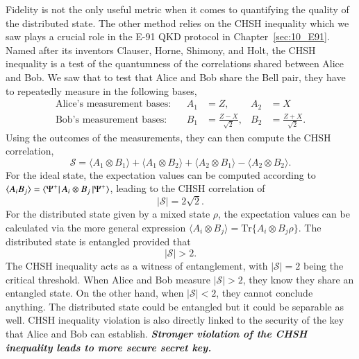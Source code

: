 Fidelity is not the only useful metric when it comes to quantifying the quality of the distributed state.
The other method relies on the CHSH inequality which we saw plays a crucial role in the E-91 QKD protocol in Chapter~\ref{sec:10_E91}.
Named after its inventors Clauser, Horne, Shimony, and Holt, the CHSH inequality is a test of the quantumness of the correlations shared between Alice and Bob.
We saw that to test that Alice and Bob share the \ket{\Psi^+} Bell pair, they have to repeatedly measure in the following bases,
\begin{align}
    \text{Alice's measurement bases:}& & A_1 & = Z, & A_2 & = X \\
    \text{Bob's measurement bases:}& & B_1 & = \frac{Z - X}{\sqrt{2}}, & B_2 & = \frac{Z + X}{\sqrt{2}}.
\end{align}
Using the outcomes of the measurements, they can then compute the CHSH correlation,
\begin{equation}
    \mathcal{S} = \langle A_1 \otimes B_1\rangle + \langle A_1 \otimes B_2\rangle + \langle A_2 \otimes B_1\rangle - \langle A_2 \otimes B_2\rangle.
    \label{eq:14-1_CHSH_Psi_plus}
\end{equation}
For the ideal state, the expectation values can be computed according to $\langle A_i B_j \rangle = \left\langle \Psi^+ \right| A_i \otimes B_j \left| \Psi^+ \right\rangle$, leading to the CHSH correlation of
\begin{equation}
    \left| \mathcal{S} \right| = 2\sqrt{2}.
\end{equation}
For the distributed state given by a mixed state $\rho$, the expectation values can be calculated via the more general expression $\langle A_i \otimes B_j \rangle = \text{Tr} \{ A_i \otimes B_j \rho \}$.
The distributed state is entangled provided that
\begin{equation}
    \left| \mathcal{S} \right| > 2.
\end{equation}
The CHSH inequality acts as a witness of entanglement, with $|\mathcal{S}| = 2$ being the critical threshold.
When Alice and Bob measure $|\mathcal{S}| > 2$, they know they share an entangled state.
On the other hand, when $|\mathcal{S}| < 2$, they cannot conclude anything. The distributed state could be entangled but it could be separable as well.
CHSH inequality violation is also directly linked to the security of the key that Alice and Bob can establish.
\textit{\textbf{Stronger violation of the CHSH inequality leads to more secure secret key.}}


